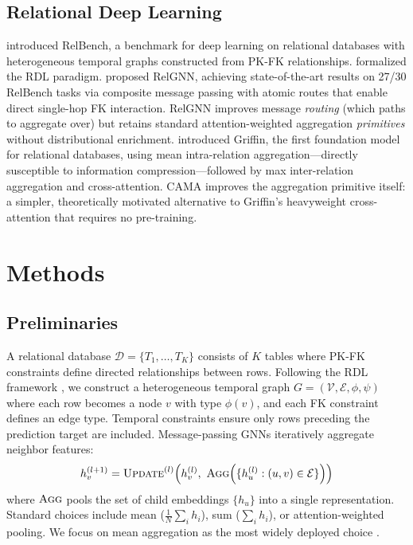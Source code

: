 \documentclass[11pt,letterpaper]{article}
\newcommand{\Agg}{\textsc{Agg}}
\newcommand{\Update}{\textsc{Update}}
\begin{document}
\subsection{Relational Deep Learning}

\citet{Robinson2024} introduced RelBench, a benchmark for deep learning on relational databases with heterogeneous temporal graphs constructed from PK-FK relationships. \citet{Fey2024} formalized the RDL paradigm. \citet{Chen2025} proposed RelGNN, achieving state-of-the-art results on 27/30 RelBench tasks via composite message passing with atomic routes that enable direct single-hop FK interaction. RelGNN improves message \emph{routing} (which paths to aggregate over) but retains standard attention-weighted aggregation \emph{primitives} without distributional enrichment. \citet{Wang2025} introduced Griffin, the first foundation model for relational databases, using mean intra-relation aggregation---directly susceptible to information compression---followed by max inter-relation aggregation and cross-attention. CAMA improves the aggregation primitive itself: a simpler, theoretically motivated alternative to Griffin's heavyweight cross-attention that requires no pre-training.


\section{Methods}
\label{sec:methods}

\subsection{Preliminaries}
\label{sec:prelim}

A relational database $\mathcal{D} = \{T_1, \ldots, T_K\}$ consists of $K$ tables where PK-FK constraints define directed relationships between rows. Following the RDL framework \citep{Robinson2024, Fey2024}, we construct a heterogeneous temporal graph $G = (\mathcal{V}, \mathcal{E}, \phi, \psi)$ where each row becomes a node $v$ with type $\phi(v)$, and each FK constraint defines an edge type. Temporal constraints ensure only rows preceding the prediction target are included. Message-passing GNNs iteratively aggregate neighbor features:
\begin{equation}
h_v^{(l+1)} = \Update^{(l)}\!\left(h_v^{(l)},\ \Agg\!\left(\{h_u^{(l)} : (u,v) \in \mathcal{E}\}\right)\right)
\label{eq:mpnn}
\end{equation}
where $\Agg$ pools the set of child embeddings $\{h_u\}$ into a single representation. Standard choices include mean ($\frac{1}{N}\sum_i h_i$), sum ($\sum_i h_i$), or attention-weighted pooling. We focus on mean aggregation as the most widely deployed choice \citep{Hamilton2017}.
\end{document}
